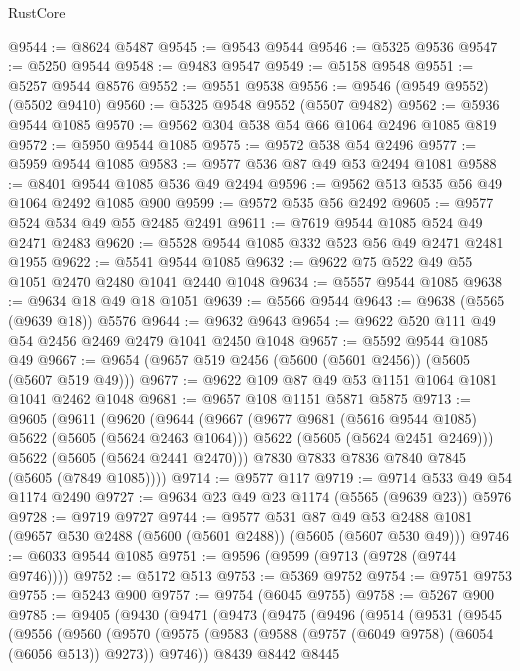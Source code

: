 \begin{lexlean}{RustCore}
\begin{coremodule}
@9544 := @8624 @5487
@9545 := @9543 @9544
@9546 := @5325 @9536
@9547 := @5250 @9544
@9548 := @9483 @9547
@9549 := @5158 @9548
@9551 := @5257 @9544 @8576
@9552 := @9551 @9538
@9556 := @9546 (@9549 @9552) (@5502 @9410)
@9560 := @5325 @9548 @9552 (@5507 @9482)
@9562 := @5936 @9544 @1085
@9570 := @9562 @304 @538 @54 @66 @1064 @2496 @1085 @819
@9572 := @5950 @9544 @1085
@9575 := @9572 @538 @54 @2496
@9577 := @5959 @9544 @1085
@9583 := @9577 @536 @87 @49 @53 @2494 @1081
@9588 := @8401 @9544 @1085 @536 @49 @2494
@9596 := @9562 @513 @535 @56 @49 @1064 @2492 @1085 @900
@9599 := @9572 @535 @56 @2492
@9605 := @9577 @524 @534 @49 @55 @2485 @2491
@9611 := @7619 @9544 @1085 @524 @49 @2471 @2483
@9620 := @5528 @9544 @1085 @332 @523 @56 @49 @2471 @2481 @1955
@9622 := @5541 @9544 @1085
@9632 := @9622 @75 @522 @49 @55 @1051 @2470 @2480 @1041 @2440 @1048
@9634 := @5557 @9544 @1085
@9638 := @9634 @18 @49 @18 @1051
@9639 := @5566 @9544
@9643 := @9638 (@5565 (@9639 @18)) @5576
@9644 := @9632 @9643
@9654 := @9622 @520 @111 @49 @54 @2456 @2469 @2479 @1041 @2450 @1048
@9657 := @5592 @9544 @1085 @49
@9667 := @9654 (@9657 @519 @2456 (@5600 (@5601 @2456)) (@5605 (@5607 @519 @49)))
@9677 := @9622 @109 @87 @49 @53 @1151 @1064 @1081 @1041 @2462 @1048
@9681 := @9657 @108 @1151 @5871 @5875
@9713 := @9605
    (@9611
      (@9620
        (@9644
          (@9667
            (@9677 @9681 (@5616 @9544 @1085) @5622 (@5605 (@5624 @2463 @1064)))
            @5622
            (@5605 (@5624 @2451 @2469)))
          @5622
          (@5605 (@5624 @2441 @2470)))
        @7830
        @7833
        @7836
        @7840
        @7845
        (@5605 (@7849 @1085))))
@9714 := @9577 @117
@9719 := @9714 @533 @49 @54 @1174 @2490
@9727 := @9634 @23 @49 @23 @1174 (@5565 (@9639 @23)) @5976
@9728 := @9719 @9727
@9744 := @9577
    @531
    @87
    @49
    @53
    @2488
    @1081
    (@9657 @530 @2488 (@5600 (@5601 @2488)) (@5605 (@5607 @530 @49)))
@9746 := @6033 @9544 @1085
@9751 := @9596 (@9599 (@9713 (@9728 (@9744 @9746))))
@9752 := @5172 @513
@9753 := @5369 @9752
@9754 := @9751 @9753
@9755 := @5243 @900
@9757 := @9754 (@6045 @9755)
@9758 := @5267 @900
@9785 := @9405
    (@9430
      (@9471
        (@9473
          (@9475
            (@9496
              (@9514
                (@9531
                  (@9545
                    (@9556
                      (@9560
                        (@9570
                          (@9575
                            (@9583 (@9588 (@9757 (@6049 @9758) (@6054 (@6056 @513)) @9273)) @9746))
                          @8439
                          @8442
                          @8445

\end{coremodule}
\end{lexlean}
